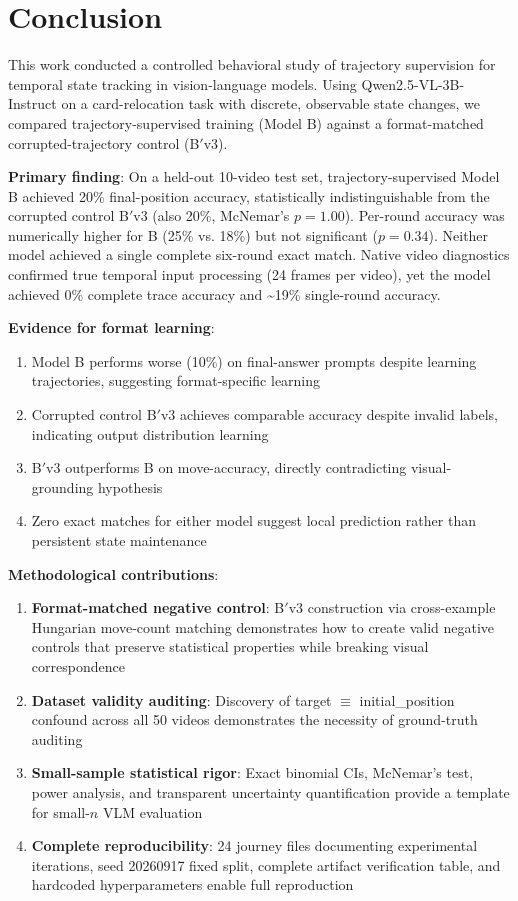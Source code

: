 \section{Conclusion}
\label{sec:conclusion}

This work conducted a controlled behavioral study of trajectory supervision for temporal state tracking in vision-language models. Using Qwen2.5-VL-3B-Instruct on a card-relocation task with discrete, observable state changes, we compared trajectory-supervised training (Model B) against a format-matched corrupted-trajectory control (B$'$v3).

\textbf{Primary finding}: On a held-out 10-video test set, trajectory-supervised Model B achieved 20\% final-position accuracy, statistically indistinguishable from the corrupted control B$'$v3 (also 20\%, McNemar's $p=1.00$). Per-round accuracy was numerically higher for B (25\% vs. 18\%) but not significant ($p=0.34$). Neither model achieved a single complete six-round exact match. Native video diagnostics confirmed true temporal input processing (24 frames per video), yet the model achieved 0\% complete trace accuracy and \textasciitilde19\% single-round accuracy.

\textbf{Evidence for format learning}: 
\begin{enumerate}
    \item Model B performs worse (10\%) on final-answer prompts despite learning trajectories, suggesting format-specific learning
    \item Corrupted control B$'$v3 achieves comparable accuracy despite invalid labels, indicating output distribution learning
    \item B$'$v3 outperforms B on move-accuracy, directly contradicting visual-grounding hypothesis
    \item Zero exact matches for either model suggest local prediction rather than persistent state maintenance
\end{enumerate}

\textbf{Methodological contributions}:
\begin{enumerate}
    \item \textbf{Format-matched negative control}: B$'$v3 construction via cross-example Hungarian move-count matching demonstrates how to create valid negative controls that preserve statistical properties while breaking visual correspondence
    \item \textbf{Dataset validity auditing}: Discovery of target $\equiv$ initial\_position confound across all 50 videos demonstrates the necessity of ground-truth auditing
    \item \textbf{Small-sample statistical rigor}: Exact binomial CIs, McNemar's test, power analysis, and transparent uncertainty quantification provide a template for small-$n$ VLM evaluation
    \item \textbf{Complete reproducibility}: 24 journey files documenting experimental iterations, seed 20260917 fixed split, complete artifact verification table, and hardcoded hyperparameters enable full reproduction
\end{enumerate}

